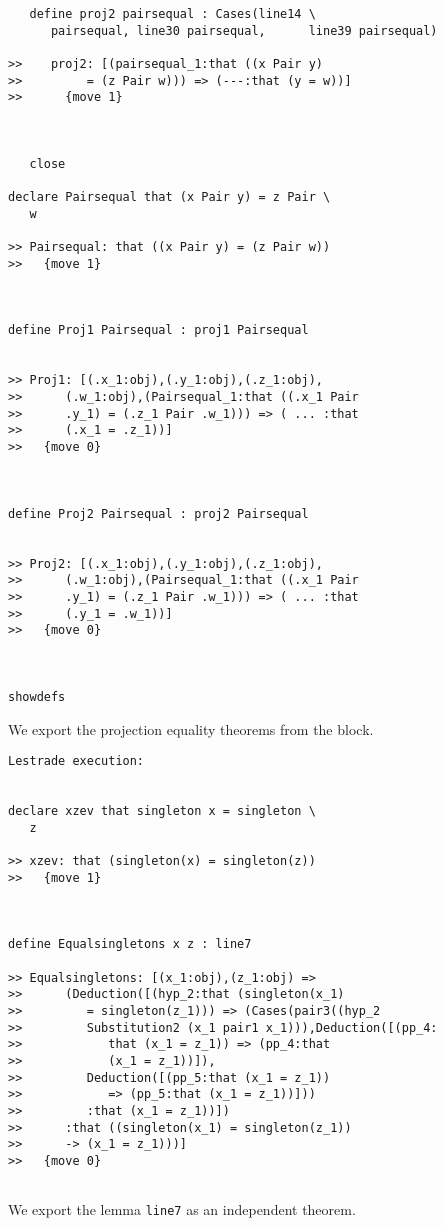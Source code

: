 \documentclass{article}
\begin{document}
\begin{verbatim}
   define proj2 pairsequal : Cases(line14 \
      pairsequal, line30 pairsequal,      line39 pairsequal)

>>    proj2: [(pairsequal_1:that ((x Pair y)
>>         = (z Pair w))) => (---:that (y = w))]
>>      {move 1}



   close

declare Pairsequal that (x Pair y) = z Pair \
   w

>> Pairsequal: that ((x Pair y) = (z Pair w))
>>   {move 1}



define Proj1 Pairsequal : proj1 Pairsequal


>> Proj1: [(.x_1:obj),(.y_1:obj),(.z_1:obj),
>>      (.w_1:obj),(Pairsequal_1:that ((.x_1 Pair
>>      .y_1) = (.z_1 Pair .w_1))) => ( ... :that
>>      (.x_1 = .z_1))]
>>   {move 0}



define Proj2 Pairsequal : proj2 Pairsequal


>> Proj2: [(.x_1:obj),(.y_1:obj),(.z_1:obj),
>>      (.w_1:obj),(Pairsequal_1:that ((.x_1 Pair
>>      .y_1) = (.z_1 Pair .w_1))) => ( ... :that
>>      (.y_1 = .w_1))]
>>   {move 0}



showdefs
\end{verbatim}

We export the projection equality theorems from the block.

\begin{verbatim}Lestrade execution:


declare xzev that singleton x = singleton \
   z

>> xzev: that (singleton(x) = singleton(z))
>>   {move 1}



define Equalsingletons x z : line7

>> Equalsingletons: [(x_1:obj),(z_1:obj) =>
>>      (Deduction([(hyp_2:that (singleton(x_1)
>>         = singleton(z_1))) => (Cases(pair3((hyp_2
>>         Substitution2 (x_1 pair1 x_1))),Deduction([(pp_4:
>>            that (x_1 = z_1)) => (pp_4:that
>>            (x_1 = z_1))]),
>>         Deduction([(pp_5:that (x_1 = z_1))
>>            => (pp_5:that (x_1 = z_1))]))
>>         :that (x_1 = z_1))])
>>      :that ((singleton(x_1) = singleton(z_1))
>>      -> (x_1 = z_1)))]
>>   {move 0}


\end{verbatim}

We export the lemma {\tt line7} as an independent theorem.
\end{document}
